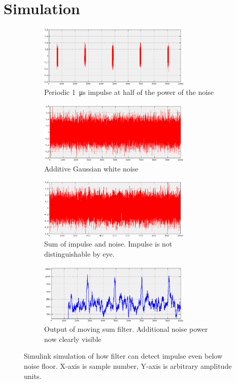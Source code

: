 \section{Simulation}
\begin{figure}
  \begin{subfigure}{\textwidth}
    \centering
    \includegraphics[width=0.8\textwidth]{impulse}
    \caption{Periodic \SI{1}{\micro\second} impulse at half of the power of the noise}
  \end{subfigure}
  \begin{subfigure}{\textwidth}
    \centering
    \includegraphics[width=0.8\textwidth]{noise}
    \caption{Additive Gaussian white noise}
  \end{subfigure}
  \begin{subfigure}{\textwidth}
    \centering
    \includegraphics[width=0.8\textwidth]{impulse-plus-noise}
    \caption{Sum of impulse and noise. Impulse is not distinguishable by eye.}
  \end{subfigure}
  \begin{subfigure}{\textwidth}
    \centering
    \includegraphics[width=0.8\textwidth]{filter}
    \caption{Output of moving sum filter. Additional noise power now clearly visible}
  \end{subfigure}
  \caption{Simulink simulation of how filter can detect impulse even below noise floor. X-axis is sample number, Y-axis is arbitrary amplitude units.}
  \label{fig:firmware:impulse-detection-simulation}
\end{figure}
